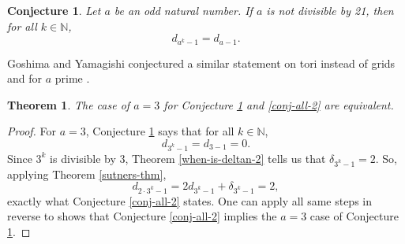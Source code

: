 \documentclass[a4paper]{article}
\newtheorem{theorem}{Theorem}[section]
\newtheorem{conjecture}{Conjecture}[section]
\newcommand{\N}{\mathbb{N}}
\begin{document}
	\begin{conjecture}\label{conj-powers}
		Let $a$ be an odd natural number.
		If $a$ is not divisible by 21, then for all $k \in \N$,
		\begin{equation*}
			d_{a^k - 1} = d_{a-1}.
		\end{equation*}
	\end{conjecture}
	Goshima and Yamagishi conjectured a similar statement on tori instead of grids and for $a$ prime \cite{GOSHIMAYAMAGISHI2010}.
	
	\begin{theorem}
		The case of $a=3$ for Conjecture \ref{conj-powers} and \ref{conj-all-2} are equivalent.
	\end{theorem}
	\begin{proof}
		For $a=3$, Conjecture \ref{conj-powers} says that for all $k \in \N$,
		\begin{equation*}
			d_{3^k - 1} = d_{3-1} = 0.
		\end{equation*}
		Since $3^k$ is divisible by 3, Theorem \ref{when-is-deltan-2} tells us that $\delta_{3^k - 1} = 2$.
		So, applying Theorem \ref{sutners-thm},
		\begin{equation*}
			d_{2\cdot3^{k} - 1} = 2d_{3^k - 1} + \delta_{3^k - 1} = 2,
		\end{equation*}
		exactly what Conjecture \ref{conj-all-2} states.
		One can apply all same steps in reverse to shows that Conjecture \ref{conj-all-2} implies the $a=3$ case of Conjecture \ref{conj-powers}.
	\end{proof}
	
	\newpage
	
	
\end{document}
